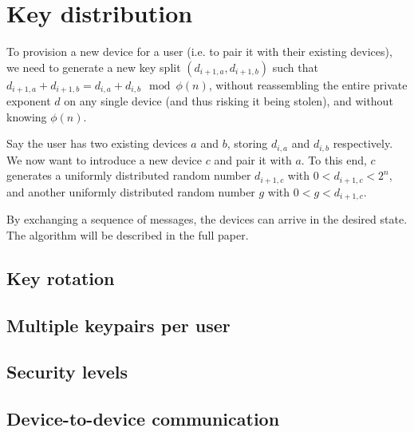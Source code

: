 \section{Key distribution}

To provision a new device for a user (i.e. to pair it with their existing devices), we need to
generate a new key split $(d_{i+1,a}, d_{i+1,b})$ such that
$d_{i+1,a} + d_{i+1,b} = d_{i,a} + d_{i,b} \mod \phi(n)$, without reassembling the entire private
exponent $d$ on any single device (and thus risking it being stolen), and without knowing $\phi(n)$.

Say the user has two existing devices $a$ and $b$, storing $d_{i,a}$ and $d_{i,b}$ respectively. We
now want to introduce a new device $c$ and pair it with $a$. To this end, $c$ generates a uniformly
distributed random number $d_{i+1,c}$ with $0 < d_{i+1,c} < 2^n$, and another uniformly distributed
random number $g$ with $0 < g < d_{i+1,c}$.

By exchanging a sequence of messages, the devices can arrive in the desired state. The algorithm
will be described in the full paper.

\subsection{Key rotation}
\subsection{Multiple keypairs per user}
\subsection{Security levels}
\subsection{Device-to-device communication}


